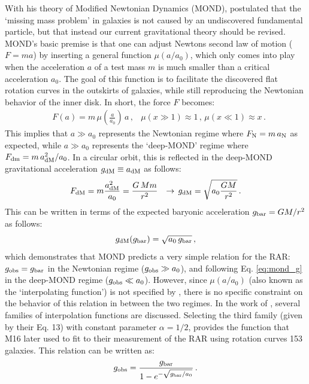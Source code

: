 \documentclass[usenatbib]{mnras}
\newcommand{\un}[1]{_{\rm #1}}
\begin{document}
With his theory of Modified Newtonian Dynamics (MOND), \cite{milgrom1983} postulated that the `missing mass problem' in galaxies is not caused by an undiscovered fundamental particle, but that instead our current gravitational theory should be revised. MOND's basic premise is that one can adjust Newtons second law of motion ($F=ma$) by inserting a general function $\mu(a/a_0)$, which only comes into play when the acceleration $a$ of a test mass $m$ is much smaller than a critical acceleration $a_0$. The goal of this function is to facilitate the discovered flat rotation curves in the outskirts of galaxies, while still reproducing the Newtonian behavior of the inner disk. In short, the force $F$ becomes:
\begin{align}\label{eq:mond_f}
	& F(a) = m \, \mu(\frac{a}{a_0}) \, a \, ,
	& \mu(x \gg 1) \approx 1 \, , \, \mu(x \ll 1) \approx x \, .
\end{align}
This implies that $a\gg a_0$ represents the Newtonian regime where $F\un{N} = m \, a\un{N}$ as expected, while $a\gg a_0$ represents the `deep-MOND' regime where $F\un{dm}=m \, a\un{dM}^2/a_0$. In a circular orbit, this is reflected in the deep-MOND gravitational acceleration $g\un{dM} \equiv a\un{dM}$ as follows:
\begin{align}\label{eq:mond_g}
	& F\un{dM} = m \frac{a\un{dM}^2}{a_0} = \frac{G \, M m}{r^2}
	& \rightarrow \,  g\un{dM} = \sqrt{a_0 \frac{G M}{r^2}} \, .
\end{align}
This can be written in terms of the expected baryonic acceleration $g\un{bar}=GM/r^2$ as follows:
\begin{equation}
	g\un{dM}(g\un{bar}) = \sqrt{a_0 \, g\un{bar}} \, ,
\end{equation}
which demonstrates that MOND predicts a very simple relation for the RAR: $g\un{obs}=g\un{bar}$ in the Newtonian regime ($g\un{obs}\gg a_0$), and following Eq. \ref{eq:mond_g} in the deep-MOND regime ($g\un{obs}\ll a_0$). However, since $\mu(a/a_0)$ (also known as the `interpolating function') is not specified by \cite{milgrom1983}, there is no specific constraint on the behavior of this relation in between the two regimes. In the work of \cite{milgrom2008}, several families of interpolation functions are discussed. Selecting the third family (given by their Eq. 13) with constant parameter $\alpha=1/2$, provides the function that M16 later used to fit to their measurement of the RAR using rotation curves 153 galaxies. This relation can be written as:
\begin{equation}\label{eq:mcgaugh}
	g\un{obs} = \frac{g\un{bar}}{1 - e^{-\sqrt{g\un{bar}/a_0}}} \, .
\end{equation}
\end{document}
